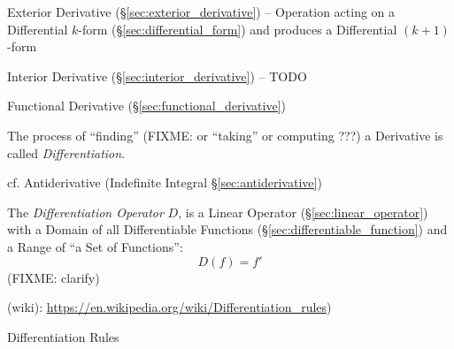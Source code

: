 \fist Exterior Derivative (\S\ref{sec:exterior_derivative}) -- Operation acting
on a Differential $k$-form (\S\ref{sec:differential_form}) and produces a
Differential $(k+1)$-form

\fist Interior Derivative (\S\ref{sec:interior_derivative}) -- TODO

\fist Functional Derivative (\S\ref{sec:functional_derivative})

The process of ``finding'' (FIXME: or ``taking'' or computing ???) a Derivative
is called \emph{Differentiation}.

\fist cf. Antiderivative (Indefinite Integral \S\ref{sec:antiderivative})

The \emph{Differentiation Operator} $D$, is a Linear Operator
(\S\ref{sec:linear_operator}) with a Domain of all Differentiable Functions
(\S\ref{sec:differentiable_function}) and a Range of ``a Set of Functions'':
\[
  D(f) = f'
\]
(FIXME: clarify)

(wiki): \url{https://en.wikipedia.org/wiki/Differentiation_rules})

Differentiation Rules


